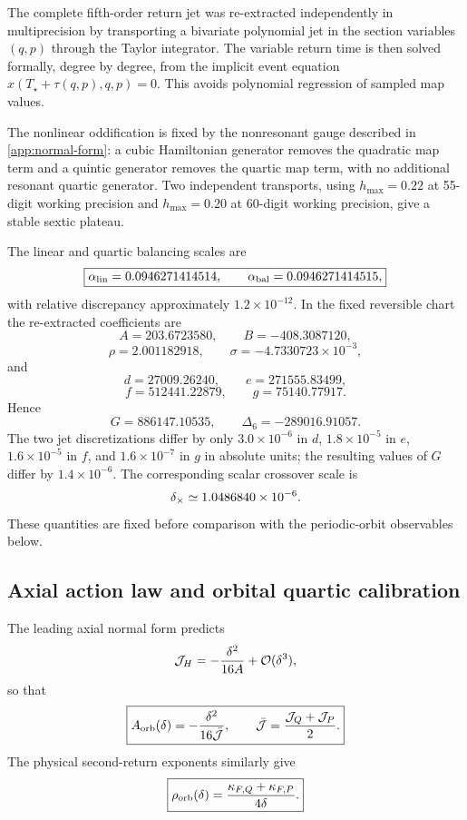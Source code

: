 The complete fifth-order return jet was re-extracted independently in multiprecision by transporting a bivariate polynomial jet in the section variables $(q,p)$ through the Taylor integrator.  The variable return time is then solved formally, degree by degree, from the implicit event equation $x(T_\star+\tau(q,p),q,p)=0$.  This avoids polynomial regression of sampled map values.

The nonlinear oddification is fixed by the nonresonant gauge described in \cref{app:normal-form}: a cubic Hamiltonian generator removes the quadratic map term and a quintic generator removes the quartic map term, with no additional resonant quartic generator.  Two independent transports, using $h_{\max}=0.22$ at 55-digit working precision and $h_{\max}=0.20$ at 60-digit working precision, give a stable sextic plateau.

The linear and quartic balancing scales are
\[
\boxed{
\alpha_{\rm lin}=0.0946271414514,\qquad
\alpha_{\rm bal}=0.0946271414515,
}
\]
with relative discrepancy approximately $1.2\times10^{-12}$.  In the fixed reversible chart the re-extracted coefficients are
\[
A=203.6723580,\qquad B=-408.3087120,
\]
\[
\rho=2.001182918,\qquad
\sigma=-4.7330723\times10^{-3},
\]
and
\[
d=27009.26240,\qquad e=271555.83499,
\]
\[
f=512441.22879,\qquad g=75140.77917.
\]
Hence
\[
\boxed{
G=886147.10535,\qquad
\Delta_6=-289016.91057.
}
\]
The two jet discretizations differ by only $3.0\times10^{-6}$ in $d$, $1.8\times10^{-5}$ in $e$, $1.6\times10^{-5}$ in $f$, and $1.6\times10^{-7}$ in $g$ in absolute units; the resulting values of $G$ differ by $1.4\times10^{-6}$.  The corresponding scalar crossover scale is
\[
\delta_\times\simeq1.0486840\times10^{-6}.
\]
These quantities are fixed before comparison with the periodic-orbit observables below.

\subsection{Axial action law and orbital quartic calibration}

The leading axial normal form predicts
\[
\mathcal{J}_H=-\frac{\delta^2}{16A}+\mathcal{O}(\delta^3),
\]
so that
\begin{equation}
\boxed{
A_{\rm orb}(\delta)
=-\frac{\delta^2}{16\bar{\mathcal{J}}},
\qquad
\bar{\mathcal{J}}=\frac{\mathcal{J}_Q+\mathcal{J}_P}{2}.
}
\label{eq:Aorb}
\end{equation}
The physical second-return exponents similarly give
\begin{equation}
\boxed{
\rho_{\rm orb}(\delta)
=
\frac{\kappa_{F,Q}+\kappa_{F,P}}{4\delta}.
}
\label{eq:rhoorb}
\end{equation}

